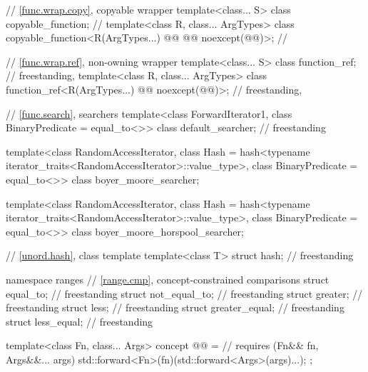 \begin{codeblock}
{  // \ref{func.wrap.copy}, copyable wrapper
  template<class... S> class copyable_function;                         // \notdef
  template<class R, class... ArgTypes>
    class copyable_function<R(ArgTypes...) @\cv{}\itcorr[-1]@ @@ noexcept(@@)>;      // \seebelow

  // \ref{func.wrap.ref}, non-owning wrapper
  template<class... S> class function_ref;                              // freestanding, \notdef
  template<class R, class... ArgTypes>
    class function_ref<R(ArgTypes...) @\cv{}\itcorr[-1]@ noexcept(@@)>;               // freestanding, \seebelow

  // \ref{func.search}, searchers
  template<class ForwardIterator1, class BinaryPredicate = equal_to<>>
    class default_searcher;                                                         // freestanding

  template<class RandomAccessIterator,
           class Hash = hash<typename iterator_traits<RandomAccessIterator>::value_type>,
           class BinaryPredicate = equal_to<>>
    class boyer_moore_searcher;

  template<class RandomAccessIterator,
           class Hash = hash<typename iterator_traits<RandomAccessIterator>::value_type>,
           class BinaryPredicate = equal_to<>>
    class boyer_moore_horspool_searcher;

  // \ref{unord.hash}, class template 
  template<class T>
    struct hash;                                                                    // freestanding

  namespace ranges {
    // \ref{range.cmp}, concept-constrained comparisons
    struct equal_to;                                                                // freestanding
    struct not_equal_to;                                                            // freestanding
    struct greater;                                                                 // freestanding
    struct less;                                                                    // freestanding
    struct greater_equal;                                                           // freestanding
    struct less_equal;                                                              // freestanding
  }

  template<class Fn, class... Args>
    concept @@ =                                                  // \expos
      requires (Fn&& fn, Args&&... args) {
        std::forward<Fn>(fn)(std::forward<Args>(args)...);
      };

}
\end{codeblock}
